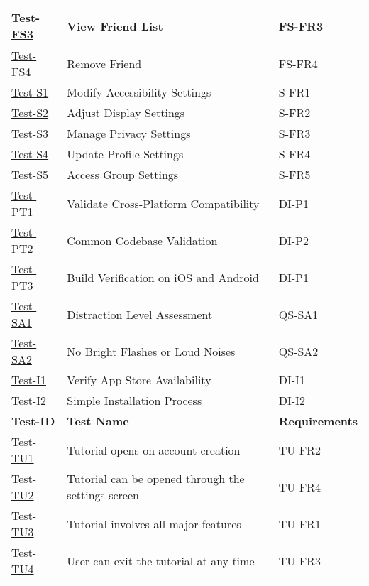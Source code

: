 \documentclass[12pt, titlepage]{article}
\begin{document}
\begin{enumerate}
\begin{table}[h!]
\begin{tabular}{|l|l|l|}
        \hline
        \hyperref[itm:Test-FS3]{Test-FS3} & View Friend List & FS-FR3 \\
        \hline
        \hyperref[itm:Test-FS4]{Test-FS4} & Remove Friend & FS-FR4 \\
        \hline
        \hyperref[itm:Test-S1]{Test-S1} & Modify Accessibility Settings & S-FR1 \\
        \hline
        \hyperref[itm:Test-S2]{Test-S2} & Adjust Display Settings & S-FR2 \\
        \hline
        \hyperref[itm:Test-S3]{Test-S3} & Manage Privacy Settings & S-FR3 \\
        \hline
        \hyperref[itm:Test-S4]{Test-S4} & Update Profile Settings & S-FR4 \\
        \hline
        \hyperref[itm:Test-S5]{Test-S5} & Access Group Settings & S-FR5 \\
        \hline
        \hyperref[itm:Test-PT1]{Test-PT1} & Validate Cross-Platform Compatibility & DI-P1 \\
        \hline
        \hyperref[itm:Test-PT2]{Test-PT2} & Common Codebase Validation & DI-P2 \\
        \hline
        \hyperref[itm:Test-PT3]{Test-PT3} & Build Verification on iOS and Android & DI-P1\\
        \hline
        \hyperref[itm:Test-SA1]{Test-SA1} & Distraction Level Assessment & QS-SA1 \\
        \hline
        \hyperref[itm:Test-SA2]{Test-SA2} & No Bright Flashes or Loud Noises & QS-SA2 \\
        \hline
        \hyperref[itm:Test-I1]{Test-I1} & Verify App Store Availability & DI-I1 \\
        \hline
        \hyperref[itm:Test-I2]{Test-I2} & Simple Installation Process & DI-I2 \\
        \hline
        \textbf{Test-ID} & \textbf{Test Name} &\textbf{Requirements} \\
        \hline
        \hyperref[itm:Test-TU1]{Test-TU1} & Tutorial opens on account creation & TU-FR2 \\
        \hline
        \hyperref[itm:Test-TU2]{Test-TU2} & Tutorial can be opened through the settings screen & TU-FR4 \\
        \hline
        \hyperref[itm:Test-TU3]{Test-TU3} & Tutorial involves all major features & TU-FR1 \\
        \hline
        \hyperref[itm:Test-TU4]{Test-TU4} & User can exit the tutorial at any time & TU-FR3 \\

\end{tabular}
\end{table}
\end{enumerate}
\end{document}
